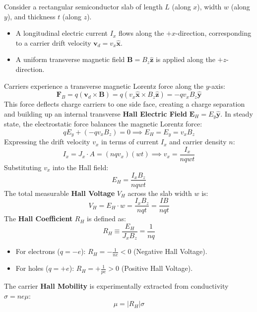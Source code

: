 \begin{derivationbox}
Consider a rectangular semiconductor slab of length $L$ (along $x$), width $w$ (along $y$), and thickness $t$ (along $z$).
\begin{itemize}
    \item A longitudinal electric current $I_x$ flows along the $+x$-direction, corresponding to a carrier drift velocity $\mathbf{v}_d = v_x \hat{\mathbf{x}}$.
    \item A uniform transverse magnetic field $\mathbf{B} = B_z \hat{\mathbf{z}}$ is applied along the $+z$-direction.
\end{itemize}
Carriers experience a transverse magnetic Lorentz force along the $y$-axis:
\begin{equation}
    \mathbf{F}_B = q (\mathbf{v}_d \times \mathbf{B}) = q (v_x \hat{\mathbf{x}} \times B_z \hat{\mathbf{z}}) = -q v_x B_z \hat{\mathbf{y}}
\end{equation}
This force deflects charge carriers to one side face, creating a charge separation and building up an internal transverse \textbf{Hall Electric Field} $\mathbf{E}_H = E_y \hat{\mathbf{y}}$. In steady state, the electrostatic force balances the magnetic Lorentz force:
\begin{equation}
    q E_y + (-q v_x B_z) = 0 \implies E_H = E_y = v_x B_z
\end{equation}
Expressing the drift velocity $v_x$ in terms of current $I_x$ and carrier density $n$:
\begin{equation}
    I_x = J_x \cdot A = (n q v_x)(w t) \implies v_x = \frac{I_x}{n q w t}
\end{equation}
Substituting $v_x$ into the Hall field:
\begin{equation}
    E_H = \frac{I_x B_z}{n q w t}
\end{equation}
The total measurable \textbf{Hall Voltage} $V_H$ across the slab width $w$ is:
\begin{equation}
    V_H = E_H \cdot w = \frac{I_x B_z}{n q t} = \frac{I B}{n q t}
\end{equation}
The \textbf{Hall Coefficient} $R_H$ is defined as:
\begin{equation}
    R_H \equiv \frac{E_H}{J_x B_z} = \frac{1}{n q}
\end{equation}
\begin{itemize}
    \item For electrons ($q = -e$): $R_H = -\frac{1}{ne} < 0$ (Negative Hall Voltage).
    \item For holes ($q = +e$): $R_H = +\frac{1}{pe} > 0$ (Positive Hall Voltage).
\end{itemize}
The carrier \textbf{Hall Mobility} is experimentally extracted from conductivity $\sigma = n e \mu$:
\begin{equation}
    \mu = |R_H| \sigma
\end{equation}
\end{derivationbox}

